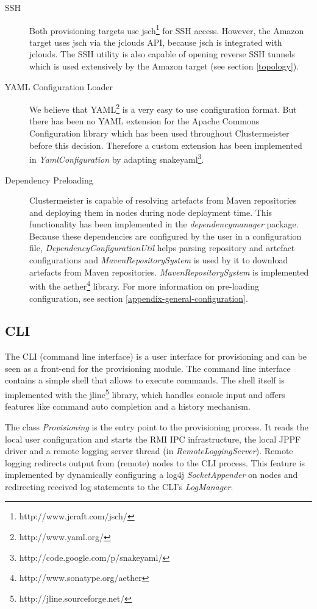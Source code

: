 \documentclass[english]{uzhpub}
\begin{document}
\begin{description}
 \item[SSH] Both provisioning targets use jsch\footnote{http://www.jcraft.com/jsch/} for SSH access. However, the Amazon target uses jsch via the jclouds API, because jsch is integrated with jclouds. The SSH utility is also capable of opening reverse SSH tunnels which is used extensively by the Amazon target (see section \ref{topology}).
 \item[YAML Configuration Loader] We believe that YAML\footnote{http://www.yaml.org/} is a very easy to use configuration format. But there has been no YAML extension for the Apache Commons Configuration library which has been used throughout Clustermeister before this decision. Therefore a custom extension has been implemented in \textit{YamlConfiguration} by adapting snakeyaml\footnote{http://code.google.com/p/snakeyaml/}. 
 \item[Dependency Preloading] Clustermeister is capable of resolving artefacts from Maven repositories and deploying them in nodes during node deployment time. This functionality has been implemented in the \textit{dependencymanager} package. Because these dependencies are configured by the user in a configuration file, \textit{DependencyConfigurationUtil} helps parsing repository and artefact configurations and \textit{MavenRepositorySystem} is used by it to download artefacts from Maven repositories. \textit{MavenRepositorySystem} is implemented with the aether\footnote{http://www.sonatype.org/aether} library. For more information on pre-loading configuration, see section \ref{appendix-general-configuration}.
\end{description}

\subsection{CLI}

The CLI (command line interface) is a user interface for provisioning and can be seen as a front-end for the provisioning module. The command line interface contains a simple shell that allows to execute commands. The shell itself is implemented with the jline\footnote{http://jline.sourceforge.net/} library, which handles console input and offers features like command auto completion and a history mechanism. 

The class \textit{Provisioning} is the entry point to the provisioning process. It reads the local user configuration and starts the RMI IPC infrastructure, the local JPPF driver and a remote logging server thread (in \textit{RemoteLoggingServer}). Remote logging redirects output from (remote) nodes to the CLI process. This feature is implemented by dynamically configuring a log4j \textit{SocketAppender} on nodes and redirecting received log statements to the CLI's \textit{LogManager}. 
\end{document}
